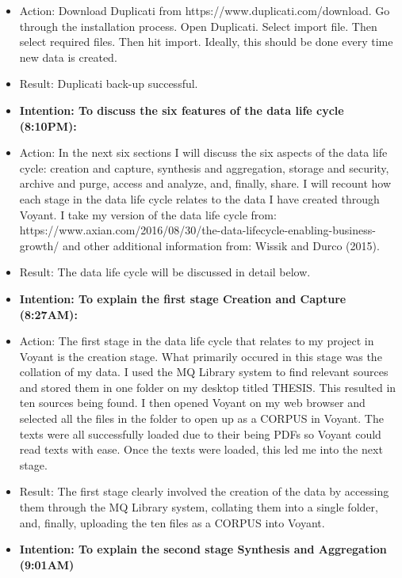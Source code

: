 \documentclass[a4paper,12pt]{article}
\begin{document}
\begin{itemize}
\item Action: Download Duplicati from https://www.duplicati.com/download. Go through the installation process. Open Duplicati. Select import file. Then select required files. Then hit import. Ideally, this should be done every time new data is created.  


\item Result: Duplicati back-up successful.


\item \textbf{Intention: To discuss the six features of the data life cycle (8:10PM):}


\item Action: In the next six sections I will discuss the six aspects of the data life cycle: creation and capture, synthesis and aggregation, storage and security, archive and purge, access and analyze, and, finally, share. I will recount how each stage in the data life cycle relates to the data I have created through Voyant. I take my version of the data life cycle from: https://www.axian.com/2016/08/30/the-data-lifecycle-enabling-business-growth/ and other additional information from: Wissik and Durco (2015). 


\item Result: The data life cycle will be discussed in detail below.


\item \textbf{Intention: To explain the first stage Creation and Capture (8:27AM):}


\item Action: The first stage in the data life cycle that relates to my project in Voyant is the creation stage. What primarily occured in this stage was the collation of my data. I used the MQ Library system to find relevant sources and stored them in one folder on my desktop titled THESIS. This resulted in ten sources being found. I then opened Voyant on my web browser and selected all the files in the folder to open up as a CORPUS in Voyant. The texts were all successfully loaded due to their being PDFs so Voyant could read texts with ease. Once the texts were loaded, this led me into the next stage. 


\item Result: The first stage clearly involved the creation of the data by accessing them through the MQ Library system, collating them into a single folder, and, finally, uploading the ten files as a CORPUS into Voyant. 


\item \textbf{Intention: To explain the second stage Synthesis and Aggregation (9:01AM)}



\end{itemize}
\end{document}
